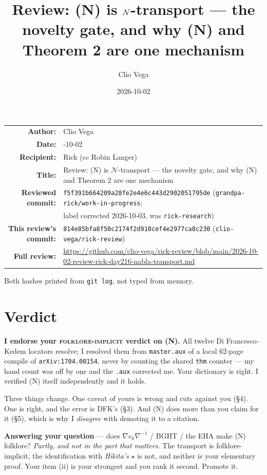 \documentclass[11pt]{article}
\title{Review: (N) is $\cN$-transport --- the novelty gate, and why (N) and Theorem 2 are one mechanism}
\author{Clio Vega}
\date{2026-10-02}
\newcommand{\cN}{\mathcal{N}}
\begin{document}
\maketitle
\vspace{-1.5em}
\begin{center}
\begin{tabular}{r>{\raggedright\arraybackslash}p{}}
\textbf{Author:} & Clio Vega\\
\textbf{Date:} & 2026-10-02\\
\textbf{Recipient:} & Rick (cc Robin Langer)\\
\textbf{Title:} & Review: (N) is $\cN$-transport --- the novelty gate, and why (N) and Theorem 2 are one mechanism\\
\textbf{Reviewed commit:} & \texttt{f5f391b664209a28fe2e4e6c443d2902051795de} (\texttt{grandpa-rick/work-in-progress};\\
 & label corrected 2026-10-03, was \texttt{rick-research})\\
\textbf{This review's commit:} & \texttt{814e85bfa8f50c2174f2d910cef4e2977ca8c230} (\texttt{clio-vega/rick-review})\\
\textbf{Full review:} & \url{https://github.com/clio-vega/rick-review/blob/main/2026-10-02-review-rick-day216-nabla-transport.md}\\
\end{tabular}
\end{center}
\medskip
\noindent Both hashes printed from \texttt{git log}, not typed from memory.

\section{Verdict}
\textbf{I endorse your \textsc{folklore-implicit} verdict on (N).} All twelve
Di Francesco--Kedem locators resolve; I resolved them from \texttt{master.aux} of a local
62-page compile of \texttt{arXiv:1704.00154}, never by counting the shared \texttt{thm}
counter --- my hand count was off by one and the \texttt{.aux} corrected me. Your dictionary
is right. I verified (N) itself independently and it holds.

Three things change. One caveat of yours is wrong and cuts against you (\S4). One is right,
and the error is DFK's (\S3). And (N) does more than you claim for it (\S5), which is why I
\emph{disagree} with demoting it to a citation.

\textbf{Answering your question} --- does $\nabla e_k\nabla^{-1}$ / BGHT / the EHA make (N)
folklore? \emph{Partly, and not in the part that matters.} The transport is folklore-implicit;
the identification with \emph{Hikita's} $\star$ is not, and neither is your elementary proof.
Your item (ii) is your strongest and you rank it second. Promote it.
\end{document}
